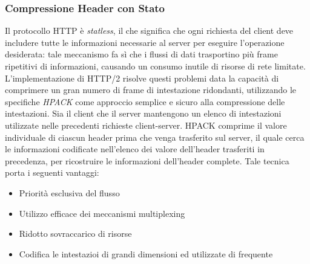 \documentclass[a4paper,11pt]{article}
\begin{document}
\subsubsection{Compressione Header con Stato}
Il protocollo HTTP è \textit{statless}, il che significa che ogni richiesta del client deve includere tutte le informazioni necessarie al server per eseguire l’operazione desiderata: tale meccanismo fa sì che i flussi di dati trasportino più frame ripetitivi di informazioni, causando un consumo inutile di risorse di rete limitate.\newline
L’implementazione di HTTP/2 risolve questi problemi data la capacità di comprimere un gran numero di frame di intestazione ridondanti, utilizzando le specifiche \textit{HPACK} come approccio semplice e sicuro alla compressione delle intestazioni.\newline
Sia il client che il server mantengono un elenco di intestazioni utilizzate nelle precedenti richieste client-server.\newline
HPACK comprime il valore individuale di ciascun header prima che venga trasferito sul server, il quale cerca le informazioni codificate nell’elenco dei valore dell’header trasferiti in precedenza, per ricostruire le informazioni dell’header complete.\bigbreak
\noindent Tale tecnica porta i seguenti vantaggi:
\begin{itemize}
    \item Priorità esclusiva del flusso
    \item Utilizzo efficace dei meccanismi multiplexing
    \item Ridotto sovraccarico di risorse
    \item Codifica le intestazioi di grandi dimensioni ed utilizzate di frequente   
\end{itemize}
\end{document}
